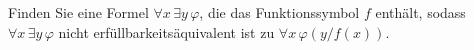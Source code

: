 
\begin{exercise}[176]
Finden Sie eine Formel $\forall x\, \exists y\, \varphi$, die das Funktionssymbol $f$
enthält, sodass $\forall x\, \exists y\, \varphi$ nicht erfüllbarkeitsäquivalent ist zu
$\forall x\, \varphi(y/f(x))$.
\end{exercise}


\begin{solution}
\phantom{}
\end{solution}

